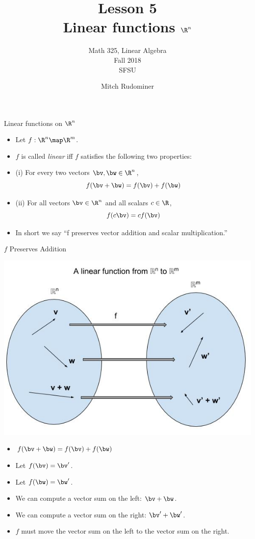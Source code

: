 \documentclass{beamer}
\title{Lesson 5 \\ Linear functions $\R^n$}
\subtitle{Math 325, Linear Algebra \\ Fall 2018 \\ SFSU}
\author{Mitch Rudominer}
\date{}
\begin{document}
\begin{frame}
  \titlepage
\end{frame}

\begin{frame}{Linear functions on $\R^n$}

\begin{itemize}
\item Let $f:\R^n \map \R^m$.
\item $f$ is called \emph{linear} iff $f$ satisfies the following two properties:
\item (i) For every two vectors $\bv, \bw \in\R^n$, $$f(\bv + \bw) = f(\bv) + f(\bw)$$
\item (ii) For all vectors $\bv\in\R^n$ and all scalars $c\in \R$,
$$f(c \bv) = c f(\bv)$$
\item In short we say ``f preserves vector addition and scalar multiplication.''
\end{itemize}

\end{frame}

\begin{frame}{$f$ Preserves Addition}

\begin{center}
\includegraphics[scale=0.25]{preserving-addition}
\end{center}

\begin{itemize}
\item $f(\bv + \bw) = f(\bv) + f(\bw)$
\item Let $f(\bv) = \bv^{\prime}$.
\item Let $f(\bw) = \bw^{\prime}$.
\item We can compute a vector sum on the left: $\bv + \bw$.
\item We can compute a vector sum on the right: $\bv^{\prime} + \bw^{\prime}$.
\item $f$ must move the vector sum on the left to the vector sum on the right.
\end{itemize}

\end{frame}
\end{document}
